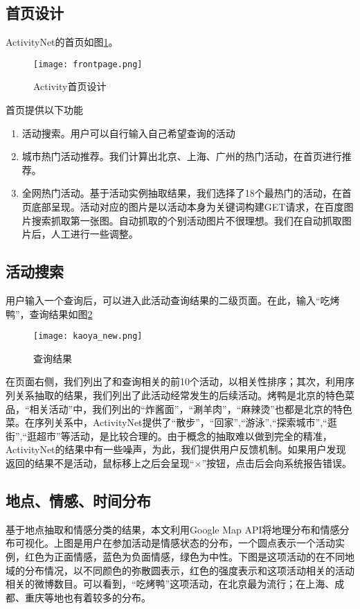 \subsection{首页设计}
ActivityNet的首页如图\ref{fig:frontpage}。

\begin{figure}[!h]
\centering
\texttt{[image: frontpage.png]}
\caption{Activity首页设计}
\label{fig:frontpage}
\end{figure}

首页提供以下功能
\begin{enumerate}
\item 活动搜索。用户可以自行输入自己希望查询的活动
\item 城市热门活动推荐。我们计算出北京、上海、广州的热门活动，在首页进行推荐。
\item 全网热门活动。基于活动实例抽取结果，我们选择了18个最热门的活动，在首页底部呈现。活动对应的图片是以活动本身为关键词构建GET请求，在百度图片搜索抓取第一张图。自动抓取的个别活动图片不很理想。我们在自动抓取图片后，人工进行一些调整。
\end{enumerate}

\subsection{活动搜索}
用户输入一个查询后，可以进入此活动查询结果的二级页面。在此，输入``吃烤鸭''，查询结果如图\ref{fig:query_kaoya}

\begin{figure}[h]
\centering
\texttt{[image: kaoya\_new.png]}
\caption{查询结果}
\label{fig:query_kaoya}
\end{figure}

在页面右侧，我们列出了和查询相关的前10个活动，以相关性排序；其次，利用序列关系抽取的结果，我们列出了此活动经常发生的后续活动。烤鸭是北京的特色菜品，``相关活动''中，我们列出的``炸酱面''，``涮羊肉''，``麻辣烫''也都是北京的特色菜。在序列关系中，ActivityNet提供了``散步''，``回家'',``游泳'',``探索城市'',``逛街'',``逛超市''等活动，是比较合理的。由于概念的抽取难以做到完全的精准，ActivityNet的结果中有一些噪声，为此，我们提供用户反馈机制。如果用户发现返回的结果不是活动，鼠标移上之后会呈现``$\times$''按钮，点击后会向系统报告错误。

\subsection{地点、情感、时间分布}
基于地点抽取和情感分类的结果，本文利用Google Map API将地理分布和情感分布可视化。上图是用户在参加活动是情感状态的分布，一个圆点表示一个活动实例，红色为正面情感，蓝色为负面情感，绿色为中性。下图是这项活动的在不同地域的分布情况，以不同颜色的弥散圆表示，红色的强度表示和这项活动相关的活动相关的微博数目。可以看到，``吃烤鸭''这项活动，在北京最为流行；在上海、成都、重庆等地也有着较多的分布。

